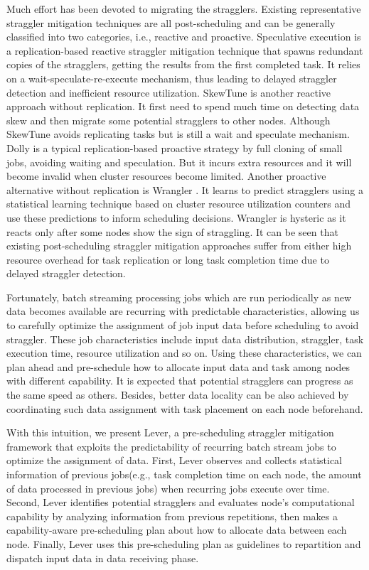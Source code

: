   Much effort has been devoted to migrating the stragglers. Existing representative straggler mitigation techniques are all post-scheduling and can be generally classified into two categories, i.e., reactive and proactive. Speculative execution \cite{Dean2004} is a replication-based reactive straggler mitigation technique that spawns redundant copies of the stragglers, getting the results from the first completed task. It relies on a wait-speculate-re-execute mechanism, thus leading to delayed straggler detection and inefficient resource utilization. SkewTune \cite{Kwon2012} is another reactive approach without replication. It first need to spend much time on detecting data skew and then  migrate some potential stragglers to other nodes. Although SkewTune avoids replicating tasks but is still a wait and speculate mechanism. Dolly \cite{Ananthanarayanan2013} is a typical replication-based proactive strategy by full cloning of small jobs, avoiding waiting and speculation. But it incurs extra resources and it will become invalid when cluster resources become limited. Another proactive alternative without replication is Wrangler \cite{Yadwadkar2014}. It learns to predict stragglers using a statistical learning technique based on cluster resource utilization counters and use these predictions to inform scheduling decisions. Wrangler is hysteric as it reacts only after some nodes show the sign of straggling. It can be seen that existing post-scheduling straggler mitigation approaches suffer from either high resource overhead for task replication or long task completion time due to delayed straggler detection.

  Fortunately, batch streaming processing jobs which are run periodically as new data becomes available \cite{Zaharia2013} are recurring with predictable characteristics, allowing us to carefully optimize the assignment of job input data before scheduling to avoid straggler. These job characteristics include input data distribution, straggler, task execution time, resource utilization and so on. Using these characteristics, we can plan ahead and pre-schedule how to allocate input data and task among nodes with different capability. It is expected that potential stragglers can progress as the same speed as others. Besides, better data locality can be also achieved by coordinating such data assignment with task placement on each node beforehand.

  With this intuition, we present Lever, a pre-scheduling straggler mitigation framework that exploits the predictability of recurring batch stream jobs to optimize the assignment of data. First, Lever observes and collects statistical information of previous jobs(e.g., task completion time on each node, the amount of data processed in previous jobs) when recurring jobs execute over time. Second, Lever identifies potential stragglers and evaluates node's computational capability by analyzing information from previous repetitions, then makes a capability-aware pre-scheduling plan about how to allocate data between each node. Finally, Lever uses this pre-scheduling plan as guidelines to repartition and dispatch input data in data receiving phase.

